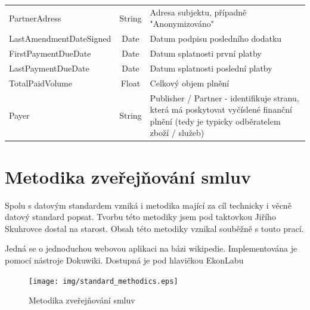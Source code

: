 \begin{center}
\begin{longtable}{lcp{65mm}}
PartnerAdress & String & Adresa subjektu, případně "Anonymizováno" \\
LastAmendmentDateSigned & Date & Datum podpisu posledního dodatku \\
FirstPaymentDueDate & Date & Datum splatnosti první platby \\
LastPaymentDueDate & Date & Datum splatnosti poslední platby \\
TotalPaidVolume & Float & Celkový objem plnění \\
\rowcolor{validateC}Payer & String & Publisher / Partner - identifikuje stranu, která má poskytovat vyčíslené finanční plnění (tedy je typicky odběratelem zboží / služeb) \\
\end{longtable}
\end{center}

\newpage

\section{Metodika zveřejňování smluv}

Spolu s datovým standardem vzniká i metodika mající za cíl technicky i věcně datový standard popsat. Tvorbu této metodiky jsem pod taktovkou Jiřího Skuhrovce dostal na starost. Obsah této metodiky vznikal souběžně s touto prací.

Jedná se o jednoduchou webovou aplikaci na bázi wikipedie. Implementována je pomocí nástroje Dokuwiki\cite{dokuwiki}. Dostupná je pod hlavičkou EkonLabu\cite{metodika}\\

\begin{figure}[h]
\centerline{\texttt{[image: img/standard\_methodics.eps]}}
\caption{Metodika zveřejňování smluv}
\label{obr:standard_methodics}
\end{figure}

